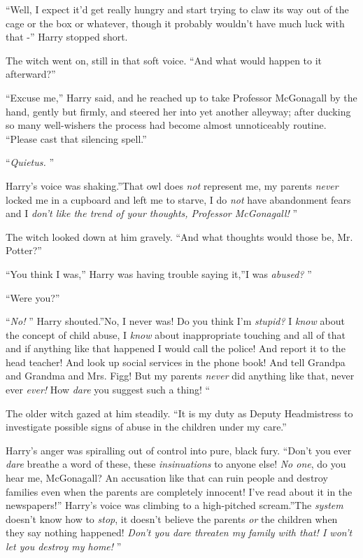 ``Well, I expect it'd get really hungry and start trying to claw its way
out of the cage or the box or whatever, though it probably wouldn't have
much luck with that -'' Harry stopped short.

The witch went on, still in that soft voice. ``And what would happen to
it afterward?''

``Excuse me,'' Harry said, and he reached up to take Professor
McGonagall by the hand, gently but firmly, and steered her into yet
another alleyway; after ducking so many well-wishers the process had
become almost unnoticeably routine. ``Please cast that silencing
spell.''

``\emph{Quietus.} ''

Harry's voice was shaking.''That owl does \emph{not} represent me, my
parents \emph{never} locked me in a cupboard and left me to starve, I do
\emph{not} have abandonment fears and I \emph{don't like the trend of
your thoughts, Professor McGonagall!} ''

The witch looked down at him gravely. ``And what thoughts would those
be, Mr. Potter?''

``You think I was,'' Harry was having trouble saying it,''I was
\emph{abused?} ''

``Were you?''

``\emph{No!} '' Harry shouted.''No, I never was! Do you think I'm
\emph{stupid?} I \emph{know} about the concept of child abuse, I
\emph{know} about inappropriate touching and all of that and if anything
like that happened I would call the police! And report it to the head
teacher! And look up social services in the phone book! And tell Grandpa
and Grandma and Mrs. Figg! But my parents \emph{never} did anything like
that, never ever \emph{ever!} How \emph{dare} you suggest such a thing!
``

The older witch gazed at him steadily. ``It is my duty as Deputy
Headmistress to investigate possible signs of abuse in the children
under my care.''

Harry's anger was spiralling out of control into pure, black fury.
``Don't you ever \emph{dare} breathe a word of these, these
\emph{insinuations} to anyone else! \emph{No one}, do you hear me,
McGonagall? An accusation like that can ruin people and destroy families
even when the parents are completely innocent! I've read about it in the
newspapers!'' Harry's voice was climbing to a high-pitched scream.''The
\emph{system} doesn't know how to \emph{stop}, it doesn't believe the
parents \emph{or} the children when they say nothing happened!
\emph{Don't you dare threaten my family with that! I won't let you
destroy my home!} ''


